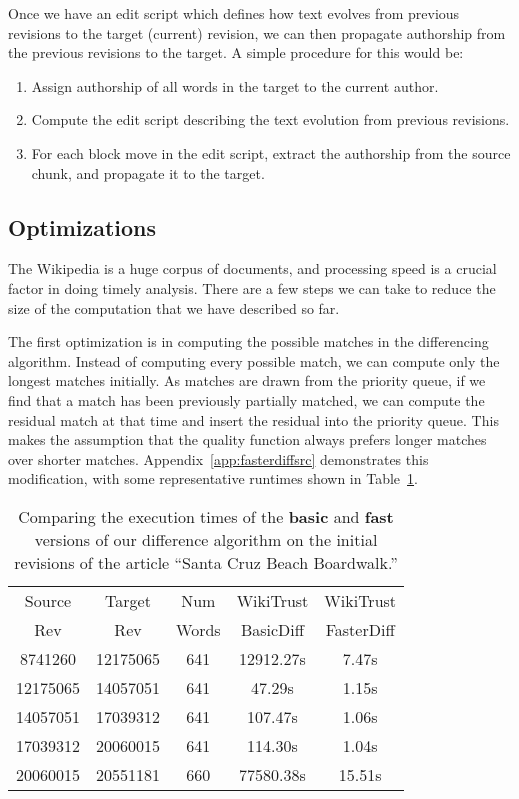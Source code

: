 Once we have an edit script which defines how text evolves from
previous revisions to the target (current) revision, we can then propagate
authorship from the previous revisions to the target.
A simple procedure for this would be:
\begin{enumerate}
\item Assign authorship of all words in the target to the current author.
\item Compute the edit script describing the text evolution from
    previous revisions.
\item For each block move in the edit script, extract the authorship
    from the source chunk, and propagate it to the target.
\end{enumerate}

\subsection{Optimizations}

The Wikipedia is a huge corpus of documents, and processing speed
is a crucial factor in doing timely analysis.
There are a few steps we can take to reduce the size of the computation
that we have described so far.

The first optimization is in computing the possible
matches in the differencing algorithm.
Instead of computing every possible match, we can compute
only the longest matches initially.
As matches are drawn from the priority queue, if we find
that a match has been previously partially matched, we can
compute the residual match at that time and insert the residual
into the priority queue.
This makes the assumption that the quality function always
prefers longer matches over shorter matches.
Appendix~\ref{app:fasterdiffsrc} demonstrates this
modification, with some representative runtimes shown
in Table~\ref{tab:comparediff}.


\begin{table}
\begin{center}
\begin{tabular}{| c | c || c || c | c |}
\hline
Source & Target & Num & WikiTrust & WikiTrust \\
Rev & Rev & Words & BasicDiff & FasterDiff \\
\hline
8741260 & 12175065 & 641 & 12912.27s & 7.47s \\
12175065 & 14057051 & 641 & 47.29s & 1.15s \\
14057051 & 17039312 & 641 & 107.47s & 1.06s \\
17039312 & 20060015 & 641 & 114.30s & 1.04s \\
20060015 & 20551181 & 660 & 77580.38s & 15.51s \\
\hline
\end{tabular}
\end{center}
\caption{Comparing the execution times of the \textbf{basic}
    and \textbf{fast} versions of our difference algorithm
    on the initial revisions of the article ``Santa Cruz Beach Boardwalk.''}
\label{tab:comparediff}
\end{table}




